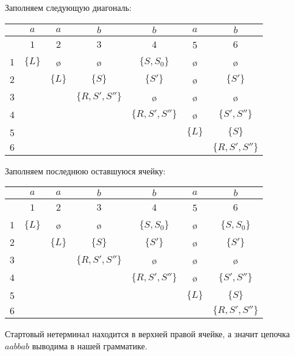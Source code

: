 \begin{example}
Заполняем следующую диагональ:

\begin{center}
  \begin{tabular}{c||cc|cc|cc}
    & $a$ & $a$ & $b$ & $b$ & $a$ & $b$ \\ \hline
    & $1$ & $2$ & $3$ & $4$ & 5 & $6$ \\ \hline \hline
  $1$ & $\{L\}$ & \o & \o & $\{S, S_0\}$ & \o & \o \\ 
  $2$ &   & $\{L\}$ & $\{S\}$ & $\{S'\}$ & \o & $\{S'\}$ \\ \hline
  $3$ &   &   & $\{R, S', S''\}$ & \o & \o & \o \\ 
  $4$ &   &   &   & $\{R, S', S''\}$ & \o & $\{S', S''\}$ \\ \hline
  5 &   &   &   &   & $\{L\}$ & $\{S\}$ \\ 
  $6$ &   &   &   &   &   & $\{R, S', S''\}$
  \end{tabular}
\end{center}

Заполняем последнюю оставшуюся ячейку:

\begin{center}
  \begin{tabular}{c||cc|cc|cc}
    & $a$ & $a$ & $b$ & $b$ & $a$ & $b$ \\ \hline
    & $1$ & $2$ & $3$ & $4$ & 5 & $6$ \\ \hline \hline
  $1$ & $\{L\}$ & \o & \o & $\{S, S_0\}$ & \o & $\{S, S_0\}$ \\ 
  $2$ &   & $\{L\}$ & $\{S\}$ & $\{S'\}$ & \o & $\{S'\}$ \\ \hline
  $3$ &   &   & $\{R, S', S''\}$ & \o & \o & \o \\ 
  $4$ &   &   &   & $\{R, S', S''\}$ & \o & $\{S', S''\}$ \\ \hline
  5 &   &   &   &   & $\{L\}$ & $\{S\}$ \\ 
  $6$ &   &   &   &   &   & $\{R, S', S''\}$
  \end{tabular}
\end{center}

Стартовый нетерминал находится в верхней правой ячейке, а значит цепочка $a a b b a b$ выводима в нашей грамматике.

\end{example}

